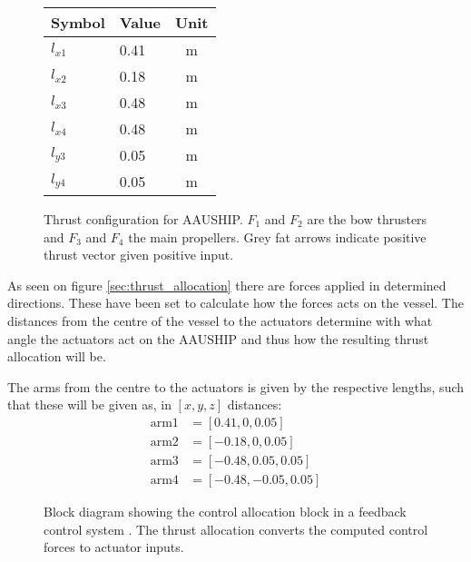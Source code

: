 \begin{figure}[htbp]
	\centering
	\begin{minipage}[l]{0.3\textwidth}
		\begin{tabular}{llc}
		\toprule
		Symbol & Value & Unit\\
		\midrule
		$l_{x1}$& 0.41 & m\\
		$l_{x2}$& 0.18 & m\\
		$l_{x3}$& 0.48 & m\\
		$l_{x4}$& 0.48 & m\\
		$l_{y3}$& 0.05 & m\\
		$l_{y4}$& 0.05 & m\\
		\bottomrule
		\end{tabular}
	\end{minipage}%
\noindent
	\begin{minipage}[l]{0.7\textwidth}
		
	\end{minipage}
	\caption{Thrust configuration for AAUSHIP. $F_1$ and $F_2$ are the
	bow thrusters and $F_3$ and $F_4$ the main propellers. Grey fat
arrows indicate positive thrust vector given positive input.} 
	\label{fig:thrust_allocation}
\end{figure}
As seen on figure \ref{sec:thrust_allocation} there are forces applied in determined directions. These have been set to calculate how the forces acts on the vessel. The distances from the centre of the vessel to the actuators determine with what angle the actuators act on the AAUSHIP and thus how the resulting thrust allocation will be.

The arms from the centre to the actuators is given by the respective lengths, such that these will be given as, in $[x, y, z]$ distances:
\begin{align}
\text{arm1} &= [0.41, 0, 0.05]\\
\text{arm2} &= [-0.18, 0, 0.05]\\
\text{arm3} &= [-0.48, 0.05, 0.05]\\
\text{arm4} &= [-0.48, -0.05, 0.05]
\end{align}


\begin{figure}[htbp]
\centering

\caption{Block diagram showing the control allocation block in a
feedback control system \citep[fig.12.25]{fossen}. The thrust
allocation converts the computed control forces to actuator inputs.}
\label{fig:thrust_allocation_block}
\end{figure}
